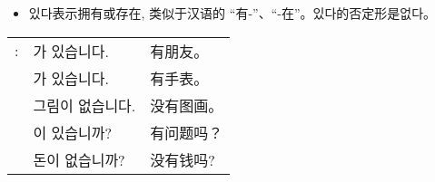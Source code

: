 \begin{grammar}
	\begin{grammarsect}[\kr 있다]
		\begin{itemize}
			\item {\kr 있다}表示拥有或存在, 类似于汉语的 “有-”、“-在”。{\kr 있다}的否定形是{\kr 없다}。
		\end{itemize}
		\begin{tabular}{lll}
			\kr \ruby{例}{예}: & \kr \ruby{親舊}{친구}가 있습니다. & 有朋友。  \\
			                 & \kr \ruby{時計}{시계}가 있습니다. & 有手表。  \\
			                 & \kr 그림이 없습니다.            & 没有图画。 \\
			                 & \kr \ruby{質問}{질문}이 있습니까? & 有问题吗？ \\
			                 & \kr 돈이 없습니까?             & 没有钱吗?
		\end{tabular}\\
	\end{grammarsect}
\end{grammar}
